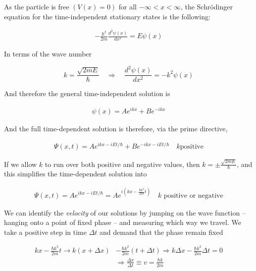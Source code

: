 As the particle is free $(V(x) = 0)$ for all $-\infty < x < \infty$, the
Schr\"odinger equation for the time-independent stationary states is the
following: 

\begin{align} \label{}
  -\frac{\hbar^2}{2m} \frac{d^2 \psi(x)}{d x^2} = E\psi(x)
\end{align}\vspace{3px}

In terms of the wave number 

\[
k = \frac{\sqrt{2mE}}{\hbar} \quad \Rightarrow \quad \frac{d^2 \psi(x)}{d x^2}
= -k^2\psi(x)
\] \vspace{3px}

And therefore the general time-independent solution is 

\begin{align} \label{}
  \psi(x) = Ae^{ikx} + Be^{-ikx}
\end{align}\vspace{3px}

And the full time-dependent solution is therefore, via the prime directive, 

\begin{align} \label{}
  \Psi(x, t) = Ae^{ikx - iEt/\hbar} + Be^{-ikx - iEt/\hbar} \quad k \text{
  positive} 
\end{align}\vspace{3px}


If we allow $k$ to run over both positive and negative values, then $k = \pm
\frac{\sqrt{2mE}}{\hbar}$, and this simplifies the time-dependent solution into 


\begin{align} \label{}
  \Psi(x, t) = Ae^{ikx - iEt/\hbar} = Ae^{i\left( kx - \frac{\hbar k^2}{2m}t
  \right) } \quad k \text{ positive or negative}   
\end{align}\vspace{3px}


We can identify the \textit{velocity} of our solutions by jumping on the wave
function -- hanging onto a point of fixed phase -- and measuring which way we
travel. We take a positive step in time $\Delta t$ and demand that the phase
remain fixed 

\begin{align} \label{}
  kx - \frac{\hbar k^2}{2m}t \rightarrow k(x + \Delta x) &- \frac{\hbar
  k^2}{2m}(t + \Delta t) \Rightarrow k\Delta x - \frac{\hbar k^2}{2m}\Delta
    t = 0 \\ &\Rightarrow \frac{\Delta x}{\Delta t} \equiv v = \frac{\hbar
    k }{2m} \label{quantumv}
\end{align}\vspace{3px}

